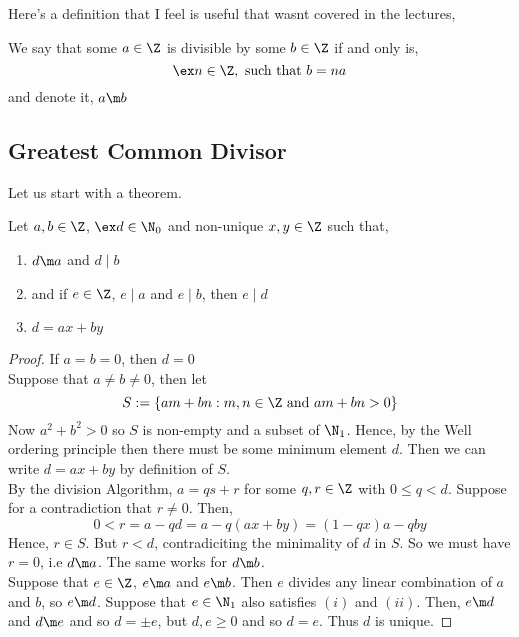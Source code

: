 \begin{tcolorbox}

  Here's a definition that I feel is useful that wasnt covered in the lectures,
  \begin{ndefi}[Divisible]
    We say that some $a \in \Z$ is divisible by some $b \in \Z$ if and only is,
    $$ \ex n \in \Z, \text{ such that } b = na$$
    and denote it, $a \m b$
  \end{ndefi}

\end{tcolorbox}

\subsection{Greatest Common Divisor}
Let us start with a theorem.
\begin{nthm}
  Let $a, b \in \Z$, $\ex d \in \N_0$ and non-unique $x, y \in \Z$ such that,
  \begin{enumerate}
    \item $d \m a$ and $d \mid b$
    \item and if $e \in \Z$, $e \mid a$ and $e \mid b$, then $e \mid d$
    \item $d = ax + by$
  \end{enumerate}
\end{nthm}

\begin{proof}
  If $a = b = 0$, then $d = 0$\\
  Suppose that $a \ne b \ne 0$, then let
  $$ S := \{am + bn : m,n \in \Z \text{ and } am + bn > 0\} $$
  Now $a^2 + b^2 > 0$ so $S$ is non-empty and a subset of $\N_1$. Hence, by the Well ordering principle then there must be some minimum element $d$. Then we can write $d = ax + by$ by definition of $S$.\\

  \noindent
  By the division Algorithm, $a = qs + r$ for some $q, r \in \Z$ with $0 \le q  < d$. Suppose for a contradiction that $r \ne 0$. Then,
  $$ 0 < r = a - qd = a - q(ax + by) = (1- qx)a - qby $$
  Hence, $r \in S$. But $r < d$, contradiciting the minimality of $d$ in $S$. So we must have $r = 0$, i.e $d \m a$. The same works for $d \m b$.\\

  \noindent
  Suppose that $e \in \Z$, $e \m a$ and $e \m b$. Then $e$ divides any linear combination of $a$ and $b$, so $e \m d$. Suppose that $e \in \N_1$ also satisfies $(i)$ and $(ii)$. Then, $e \m d$ and $d \m e$ and so $d = \pm e$, but $d, e \ge 0$ and so $d = e$. Thus $d$ is unique.
\end{proof}

